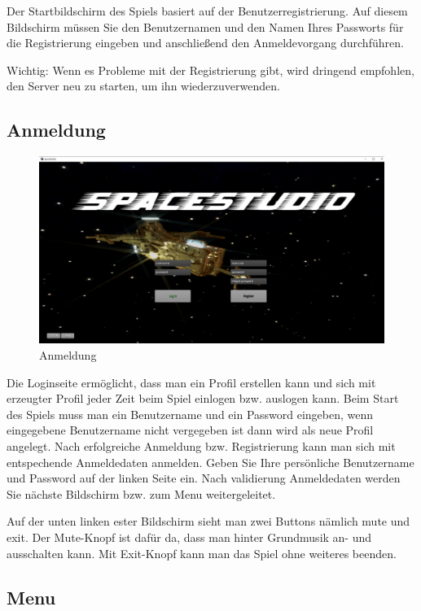 \documentclass[fontsize=12pt,paper=a4,twoside]{scrartcl}
\begin{document}
Der Startbildschirm des Spiels basiert auf der Benutzerregistrierung. Auf diesem Bildschirm müssen Sie den Benutzernamen und den Namen Ihres Passworts für die Registrierung eingeben und anschließend den Anmeldevorgang durchführen.

Wichtig: Wenn es Probleme mit der Registrierung gibt, wird dringend empfohlen, den Server neu zu starten, um ihn wiederzuverwenden.

\subsection{Anmeldung}
\begin{figure}[htp]
	\includegraphics[width=1.00\linewidth]{pics/loginscreen.png}
	\caption{Anmeldung}
	\label{fig1}
\end{figure}
Die Loginseite ermöglicht, dass man ein Profil erstellen kann und sich mit erzeugter Profil jeder Zeit beim Spiel einlogen bzw. auslogen kann. Beim Start des Spiels muss man ein Benutzername und ein Password eingeben, wenn eingegebene Benutzername nicht vergegeben ist dann wird als neue Profil angelegt. Nach erfolgreiche Anmeldung bzw. Registrierung kann man sich mit entspechende Anmeldedaten anmelden. Geben Sie Ihre persönliche Benutzername und Password auf der linken Seite ein. Nach validierung Anmeldedaten werden Sie nächste Bildschirm bzw. zum Menu weitergeleitet. 

Auf der unten linken ester Bildschirm sieht man zwei Buttons nämlich mute und exit. Der Mute-Knopf ist dafür da, dass man hinter Grundmusik an- und ausschalten kann. Mit Exit-Knopf kann man das Spiel ohne weiteres beenden.

\newpage

\subsection{Menu}
\end{document}
